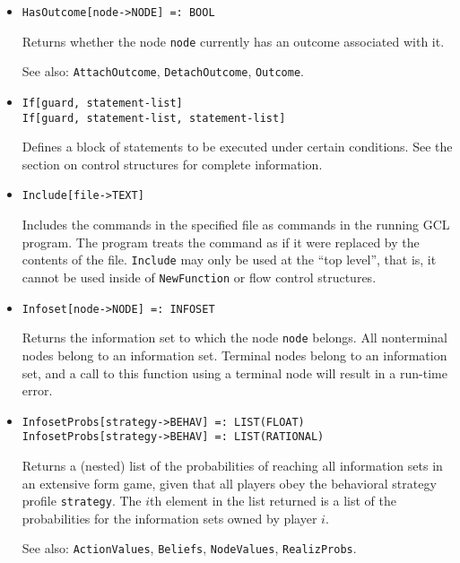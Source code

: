 \begin{itemize}
\item
\protect \large \begin{verbatim}
HasOutcome[node->NODE] =: BOOL
\end{verbatim} \normalsize

\bd
Returns whether the node \verb+node+ currently has an outcome associated
with it.
\item
[See also:] {\tt AttachOutcome}, {\tt DetachOutcome}, {\tt Outcome}.
\ed


\item 
\protect \large \begin{verbatim}
If[guard, statement-list]
If[guard, statement-list, statement-list]
\end{verbatim} \normalsize
  
\bd
Defines a block of statements to be executed under certain conditions.
See the section on control structures for complete information. 
\ed


\item
\protect \large \begin{verbatim}
Include[file->TEXT]
\end{verbatim}\normalsize

\bd
Includes the commands in the specified file as commands
in the running GCL program.  The program treats the command as if it
were replaced by the contents of the file.  \verb+Include+ may only be used
at the ``top level'', that is, it cannot be used inside of \verb+NewFunction+
or flow control structures.
\ed

\item
\protect \large \begin{verbatim}
Infoset[node->NODE] =: INFOSET
\end{verbatim}\normalsize

\bd
Returns the information set to which the node \verb+node+
belongs.  All nonterminal nodes belong to an information set.  Terminal
nodes belong to an information set, and a call to this function using
a terminal node will result in a run-time error.
\ed

\item
\protect \large \begin{verbatim}
InfosetProbs[strategy->BEHAV] =: LIST(FLOAT)
InfosetProbs[strategy->BEHAV] =: LIST(RATIONAL)
\end{verbatim}\normalsize

\bd
Returns a (nested) list of the probabilities of reaching all information
sets in an extensive form game, given that all players obey the
behavioral strategy profile \verb+strategy+.  The $i$th element
in the list returned is a list of the probabilities for the information
sets owned by player $i$.
\item
[See also:] {\tt ActionValues}, {\tt Beliefs}, {\tt NodeValues},
{\tt RealizProbs}.
\ed


\end{itemize}
